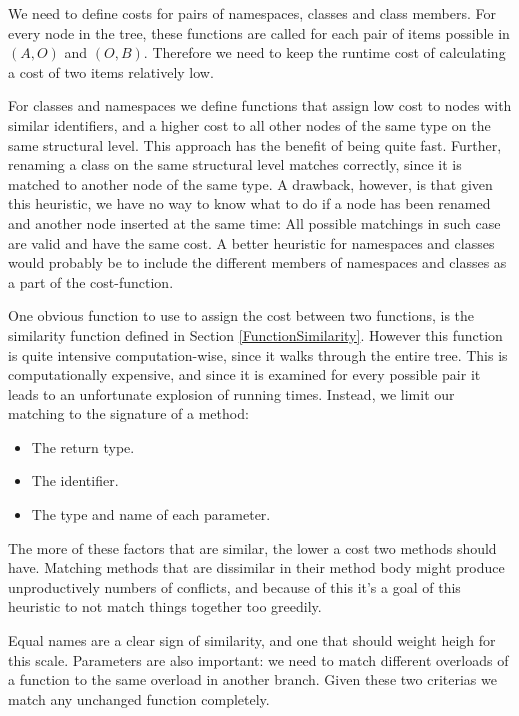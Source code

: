 \documentclass[11pt]{article}
\begin{document}
We need to define costs for pairs of namespaces, classes and class members. For every node in the tree, these functions are called for each pair of items possible in $(A, O)$ and $(O, B)$. Therefore we need to keep the runtime cost of calculating a cost of two items relatively low.

For classes and namespaces we define functions that assign low cost to nodes with similar identifiers, and a higher cost to all other nodes of the same type on the same structural level. This approach has the benefit of being quite fast. Further, renaming a class on the same structural level matches correctly, since it is matched to another node of the same type. A drawback, however, is that given this heuristic, we have no way to know what to do if a node has been renamed and another node inserted at the same time: All possible matchings in such case are valid and have the same cost. A better heuristic for namespaces and classes would probably be to include the different members of namespaces and classes as a part of the cost-function.

One obvious function to use to assign the cost between two functions, is the similarity function defined in Section \ref{FunctionSimilarity}. However this function is quite intensive computation-wise, since it walks through the entire tree. This is computationally expensive, and since it is examined for every possible pair it leads to an unfortunate explosion of running times. Instead, we limit our matching to the signature of a method:

\begin{itemize}
    \item The return type.
    \item The identifier.
    \item The type and name of each parameter.
\end{itemize}

The more of these factors that are similar, the lower a cost two methods should have. Matching methods that are dissimilar in their method body might produce unproductively numbers of conflicts, and because of this it's a goal of this heuristic to not match things together too greedily.

Equal names are a clear sign of similarity, and one that should weight heigh for this scale. Parameters are also important: we need to match different overloads of a function to the same overload in another branch. Given these two criterias we match any unchanged function completely.
\end{document}
